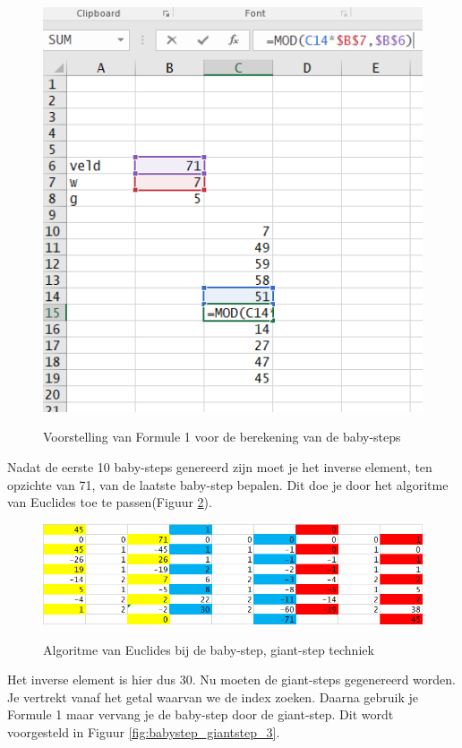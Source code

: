 \documentclass{article}
\begin{document}
\begin{enumerate}
\begin{figure}
  \begin{center}
  \caption{Voorstelling van Formule 1 voor de berekening van de baby-steps}
  \includegraphics[width=\textwidth]{babystep_giantstep_1}
  \label{fig:babystep_giantstep_1}
  \end{center}
  
\end{figure}
  
 
Nadat de eerste 10 baby-steps genereerd zijn moet je het inverse element, ten opzichte van 71, van de laatste baby-step bepalen. Dit doe je door het algoritme van Euclides toe te passen(Figuur \ref{fig:babystep_giantstep_2}).

\begin{figure}
  \begin{center}
  \caption{Algoritme van Euclides bij de baby-step, giant-step techniek}
  \includegraphics[width=\textwidth]{babystep_giantstep_2}
  \label{fig:babystep_giantstep_2}
  \end{center}
\end{figure}
Het inverse element is hier dus 30. Nu moeten de giant-steps gegenereerd worden. Je vertrekt vanaf het getal waarvan we de index zoeken. Daarna gebruik je Formule 1 maar vervang je de baby-step door de giant-step. Dit wordt voorgesteld in Figuur \ref{fig:babystep_giantstep_3}.



\end{enumerate}
\end{document}
